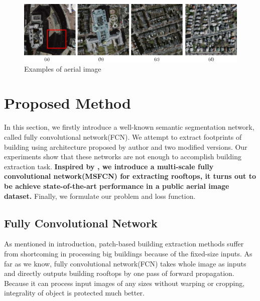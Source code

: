 \documentclass[runningheads]{llncs}
\begin{document}
\begin{figure}
\centering
\label{fig:AerialImages}
\includegraphics[width=120mm]{AerialImages}
\caption{Examples of aerial image}
\end{figure}

\section{Proposed Method} 
    In this section, we firstly introduce a well-known semantic segmentation network, called fully convolutional network(FCN)\cite{Long2014Fully}. We attempt to extract footprints of building  using  architecture proposed by author and two modified versions. Our experiments show that these networks are not enough to accomplish building  extraction task. \textbf{Inspired by \cite{Xie2015Holistically}, we introduce a multi-scale fully convolutional network(MSFCN) for extracting rooftops, it turns out to be achieve state-of-the-art performance in a public aerial image dataset.} Finally, we formulate our problem and loss function.
         
\subsection{Fully Convolutional Network}
    As mentioned in introduction, patch-based building extraction methods \cite{Mnih2013Machine} \cite{Saito2016Multiple} suffer from shortcoming in processing big buildings because of the fixed-size inputs. As far as we know, fully convolutional network(FCN) takes whole image as inputs and directly outputs building rooftops by one pass of forward propagation. Because it can process input images of any sizes without warping or cropping, integrality of object is protected much better. 
	
\end{document}
